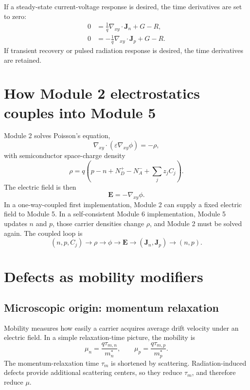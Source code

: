 \documentclass[11pt]{article}
\newcommand{\Evec}{\bm{E}}
\newcommand{\Jvec}{\bm{J}}
\newcommand{\gradxy}{\nabla_{xy}}
\newcommand{\divxy}{\nabla_{xy}\cdot}
\begin{document}
If a steady-state current-voltage response is desired, the time derivatives are set to zero:
\begin{align}
0&=\frac{1}{q}\divxy \Jvec_n+G-R, \\
0&=-\frac{1}{q}\divxy \Jvec_p+G-R.
\end{align}
If transient recovery or pulsed radiation response is desired, the time derivatives are retained.

\section{How Module 2 electrostatics couples into Module 5}

Module 2 solves Poisson's equation,
\begin{equation}
\gradxy\cdot\left(\varepsilon \gradxy\phi\right)=-\rho,
\end{equation}
with semiconductor space-charge density
\begin{equation}
\rho=q\left(p-n+N_D^+-N_A^-+\sum_j z_j C_j\right).
\end{equation}
The electric field is then
\begin{equation}
\Evec=-\gradxy\phi.
\end{equation}
In a one-way-coupled first implementation, Module 2 can supply a fixed electric field to Module 5. In a self-consistent Module 6 implementation, Module 5 updates \(n\) and \(p\), those carrier densities change \(\rho\), and Module 2 must be solved again. The coupled loop is
\begin{equation}
(n,p,C_j)\rightarrow \rho \rightarrow \phi \rightarrow \Evec \rightarrow (\Jvec_n,\Jvec_p)\rightarrow (n,p).
\end{equation}

\section{Defects as mobility modifiers}

\subsection{Microscopic origin: momentum relaxation}

Mobility measures how easily a carrier acquires average drift velocity under an electric field. In a simple relaxation-time picture, the mobility is
\begin{equation}
\boxed{\mu_n=\frac{q\tau_{m,n}}{m_n^*},\qquad \mu_p=\frac{q\tau_{m,p}}{m_p^*}.}
\end{equation}
The momentum-relaxation time \(\tau_m\) is shortened by scattering. Radiation-induced defects provide additional scattering centers, so they reduce \(\tau_m\), and therefore reduce \(\mu\).
\end{document}
